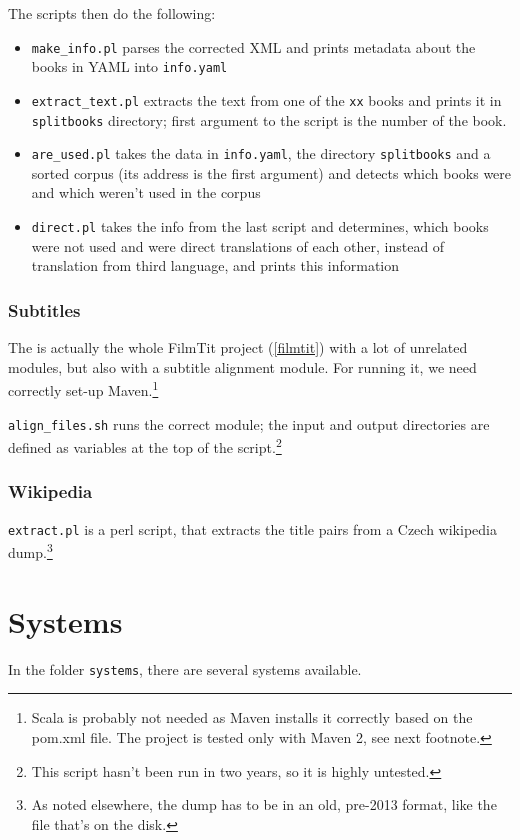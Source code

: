 The scripts then do the following:
\begin{itemize}
\item \texttt{make\_info.pl} parses the corrected XML and prints metadata about the books in YAML into \texttt{info.yaml}
\item \texttt{extract\_text.pl} extracts the text from one of the \texttt{xx} books and prints it in \texttt{splitbooks} directory; first argument to the script is the number of the book.  
\item \texttt{are\_used.pl} takes the data in \texttt{info.yaml}, the directory \texttt{splitbooks} and a sorted corpus (its address is the first argument) and detects which books were and which weren't used in the corpus
\item \texttt{direct.pl} takes the info from the last script and determines, which books were not used and were direct translations of each other, instead of translation from third language, and prints this information
\end{itemize}

\subsubsection{Subtitles}

The  is actually the whole FilmTit project (\ref{filmtit}) with a lot of unrelated modules, but also with a subtitle alignment module. For running it, we need correctly set-up Maven.\footnote{Scala is probably not needed as Maven installs it correctly based on the pom.xml file. The project is tested only with Maven 2, see next footnote.} 

\texttt{align\_files.sh} runs the correct module; the input and output directories are defined as variables at the top of the script.\footnote{This script
hasn't been run in two years, so it is highly untested.}

\subsubsection{Wikipedia}
\texttt{extract.pl} is a perl script, that extracts the title pairs from a Czech wikipedia dump.\footnote{As noted elsewhere, the dump has to be in an old, pre-2013 format, like the file that's on the disk.}

\section{Systems}
In the folder \texttt{systems}, there are several systems available.
